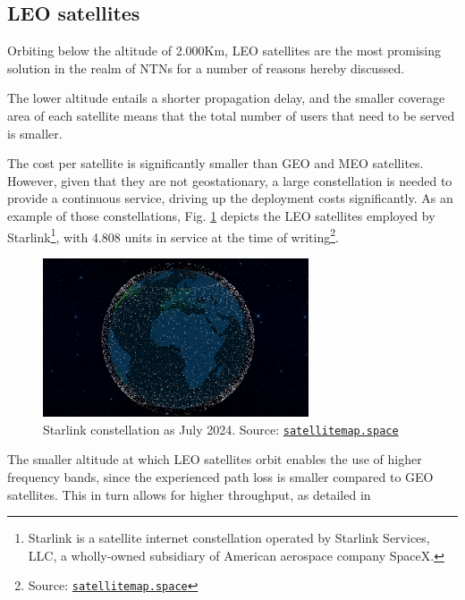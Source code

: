 \subsection{LEO satellites}
Orbiting below the altitude of 2.000Km, \ac{LEO} satellites are the most promising solution in the realm of \ac{NTNs} for a number of reasons hereby discussed.
    
The lower altitude entails a shorter propagation delay, and the smaller coverage area of each satellite means that the total number of users that need to be served is smaller. 

The cost per satellite is significantly smaller than \ac{GEO} and \ac{MEO} satellites. However, given that they are not geostationary, a large constellation is needed to provide a continuous service, driving up the deployment costs significantly. As an example of those constellations, Fig. \ref{fig:starlink_constellation} depicts the \ac{LEO} satellites employed by Starlink\footnote{Starlink is a satellite internet constellation operated by Starlink Services, LLC, a wholly-owned subsidiary of American aerospace company SpaceX.}, with 4.808 units in service at the time of writing\footnote{Source: \href{https://satellitemap.space/}{\texttt{satellitemap.space}}}.

\begin{figure}[ht]
    \centering
    \includegraphics[width=0.7\textwidth]{res/starlink-constellation.png}
    \caption{Starlink constellation as July 2024. Source: \href{https://satellitemap.space/}{\texttt{satellitemap.space}}}
    \label{fig:starlink_constellation}
\end{figure}

The smaller altitude at which \ac{LEO} satellites orbit enables the use of higher frequency bands, since the experienced path loss is smaller compared to \ac{GEO} satellites. This in turn allows for higher throughput, as detailed in \cite{satellite-communication-mmwave-giordani}

